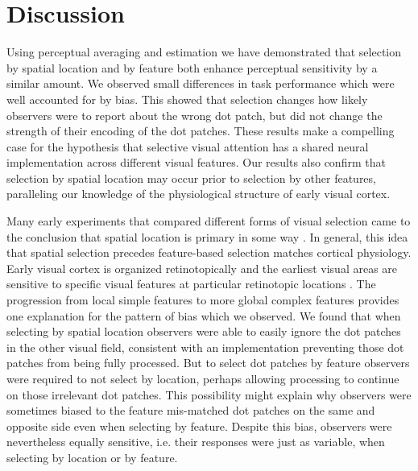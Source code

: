 \section{Discussion}

Using perceptual averaging and estimation we have demonstrated that selection by spatial location and by feature both enhance perceptual sensitivity by a similar amount. We observed small differences in task performance which were well accounted for by bias. This showed that selection changes how likely observers were to report about the wrong dot patch, but did not change the strength of their encoding of the dot patches. These results make a compelling case for the hypothesis that selective visual attention has a shared neural implementation across different visual features. Our results also confirm that selection by spatial location may occur prior to selection by other features, paralleling our knowledge of the physiological structure of early visual cortex. 

Many early experiments that compared different forms of visual selection came to the conclusion that spatial location is primary in some way \citep{Liu2007-ed,Treisman1980-gu,Tsal1988-qx,Snyder1972-og,Hillyard1984-qk,Harter1982-vj,Soto2004-cs}. In general, this idea that spatial selection precedes feature-based selection matches cortical physiology. Early visual cortex is organized retinotopically \citep{Wandell2007-pr} and the earliest visual areas are sensitive to specific visual features at particular retinotopic locations \citep{Kuffler1953-qw,Hubel1959-fo,Hubel1962-pn}. The progression from local simple features to more global complex features provides one explanation for the pattern of bias which we observed. We found that when selecting by spatial location observers were able to easily ignore the dot patches in the other visual field, consistent with an implementation preventing those dot patches from being fully processed. But to select dot patches by feature observers were required to not select by location, perhaps allowing processing to continue on those irrelevant dot patches. This possibility might explain why observers were sometimes biased to the feature mis-matched dot patches on the same and opposite side even when selecting by feature. Despite this bias, observers were nevertheless equally sensitive, i.e. their responses were just as variable, when selecting by location or by feature.